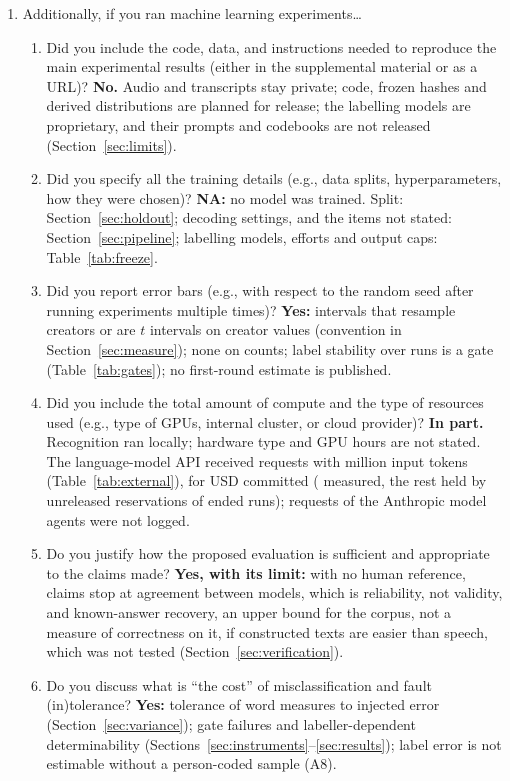 {\begin{enumerate}
\item Additionally, if you ran machine learning experiments\ldots
\begin{enumerate}
\item Did you include the code, data, and instructions needed to reproduce the main experimental results (either in the supplemental material or as a URL)? \textbf{No.} Audio and transcripts stay private; code, frozen hashes and derived distributions are planned for release; the labelling models are proprietary, and their prompts and codebooks are not released (Section~\ref{sec:limits}).
\item Did you specify all the training details (e.g., data splits, hyperparameters, how they were chosen)? \textbf{NA:} no model was trained. Split: Section~\ref{sec:holdout}; decoding settings, and the items not stated: Section~\ref{sec:pipeline}; labelling models, efforts and output caps: Table~\ref{tab:freeze}.
\item Did you report error bars (e.g., with respect to the random seed after running experiments multiple times)? \textbf{Yes:} intervals that resample creators or are $t$ intervals on creator values (convention in Section~\ref{sec:measure}); none on counts; label stability over runs is a gate (Table~\ref{tab:gates}); no first-round estimate is published.
\item Did you include the total amount of compute and the type of resources used (e.g., type of GPUs, internal cluster, or cloud provider)? \textbf{In part.} Recognition ran locally; hardware type and GPU hours are not stated. The language-model API received \ExtRequests{} requests with \ExtInputTokensM{} million input tokens (Table~\ref{tab:external}), for \FinalCommitted{} USD committed (\SpendMeasured{} measured, the rest held by unreleased reservations of ended runs); requests of the Anthropic model agents were not logged.
\item Do you justify how the proposed evaluation is sufficient and appropriate to the claims made? \textbf{Yes, with its limit:} with no human reference, claims stop at agreement between models, which is reliability, not validity, and known-answer recovery, an upper bound for the corpus, not a measure of correctness on it, if constructed texts are easier than speech, which was not tested (Section~\ref{sec:verification}).
\item Do you discuss what is ``the cost'' of misclassification and fault (in)tolerance? \textbf{Yes:} tolerance of word measures to injected error (Section~\ref{sec:variance}); gate failures and labeller-dependent determinability (Sections~\ref{sec:instruments}--\ref{sec:results}); label error is not estimable without a person-coded sample (A8).
\end{enumerate}


\end{enumerate}}
